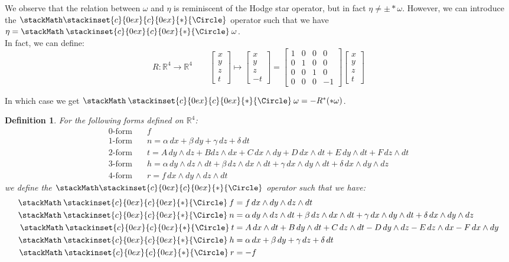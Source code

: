 \documentclass[11pt,oneside]{book}
\theoremstyle{break}
\theoremstyle{break}
\newtheorem{defn}{Definition}[corL]
\newcommand{\R}{\mathbb{R}}
\newcommand{\bmat}[1]{\begin{bmatrix} #1 \end{bmatrix}}
\newcommand\oast{\stackMath\mathbin{\stackinset{c}{0ex}{c}{0ex}{\ast}{\Circle}}}
\begin{document}
We observe that the relation between $\omega$ and $\eta$ is reminiscent of the Hodge star operator, but in fact $\eta \neq \pm *\omega$. However, we can  introduce the $\oast$ operator such that we have $\eta = \oast \omega$.\\

In fact, we can define: $$R:\R^4 \to \R^4 \qquad \bmat{x\\y\\z\\t}\mapsto \bmat{x\\y\\z\\-t} = \bmat{1&0&0&0 \\ 0&1&0&0 \\ 0&0&1&0 \\ 0&0&0&-1}\bmat{x\\y\\z\\t}$$

In which case we get $\oast \omega = -R^*(*\omega)$.

\begin{defn}
For the following forms defined on $\R^4$:
\begin{align*}
0\text{-form} &\quad f\\ 
1\text{-form} &\quad n = \alpha\, dx+\beta\, dy+\gamma\, dz+ \delta\, dt\\
2\text{-form} &\quad t = A\, dy\wedge dz+Bdz\wedge dx+C\, dx\wedge dy+D\, dx\wedge dt +E\, dy \wedge dt+F\, dz\wedge dt\\ 
3\text{-form} &\quad h =\alpha \, dy\wedge dz\wedge dt+\beta \,dz\wedge dx\wedge dt + \gamma\, dx\wedge dy \wedge dt+ \delta \, dx\wedge dy \wedge dz \\
4\text{-form} &\quad r = f\, dx\wedge dy\wedge dz\wedge dt
\end{align*}
we define the $\oast$ operator such that we have:
\begin{align*}
\oast f &= f\, dx\wedge dy\wedge dz\wedge dt\\
\oast n &= \alpha \, dy \wedge dz \wedge dt + \beta\, dz\wedge dx \wedge dt + \gamma\, dx \wedge dy \wedge dt + \delta \, dx\wedge dy \wedge dz\\
\oast t &= A\, dx\wedge dt + B\, dy \wedge dt + C \, dz\wedge dt - D\, dy \wedge dz - E\, dz \wedge dx -  F\, dx \wedge dy\\
\oast h &= \alpha\, dx + \beta \, dy + \gamma\, dz + \delta \, dt \\
\oast r &=  -f
\end{align*}
\end{defn}
\end{document}
